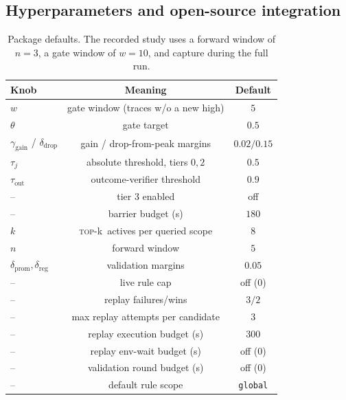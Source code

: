 \documentclass[11pt,letterpaper]{article}
\newcommand{\dpromote}{\delta_{\mathrm{prom}}}
\newcommand{\dregress}{\delta_{\mathrm{reg}}}
\newcommand{\topk}{\textsc{top-}k}
\newcommand{\gwin}{w}
\newcommand{\gtarget}{\theta}
\newcommand{\ggain}{\gamma_{\mathrm{gain}}}
\newcommand{\gdrop}{\delta_{\mathrm{drop}}}
\begin{document}
\subsection{Hyperparameters and open-source integration}
\label{sec:hyper}

\begin{table}[t]
\centering\small
\caption{Package defaults. The recorded study uses a forward window of $n=3$, a gate window of
$\gwin=10$, and capture during the full run.}
\label{tab:hyper}
\begin{tabular}{@{}lcc@{}}
\toprule
Knob & Meaning & Default \\
\midrule
$\gwin$ & gate window (traces w/o a new high) & $5$ \\
$\gtarget$ & gate target & $0.5$ \\
$\ggain$ / $\gdrop$ & gain / drop-from-peak margins & $0.02/0.15$ \\
$\tau_j$ & absolute threshold, tiers $0,2$ & $0.5$ \\
$\tau_{\mathrm{out}}$ & outcome-verifier threshold & $0.9$ \\
-- & tier 3 enabled & off \\
-- & barrier budget (s) & $180$ \\
$k$ & \topk\ actives per queried scope & $8$ \\
$n$ & forward window & $5$ \\
$\dpromote,\dregress$ & validation margins & $0.05$ \\
-- & live rule cap & off ($0$) \\
-- & replay failures/wins & $3/2$ \\
-- & max replay attempts per candidate & $3$ \\
-- & replay execution budget (s) & $300$ \\
-- & replay env-wait budget (s) & off ($0$) \\
-- & validation round budget (s) & off ($0$) \\
-- & default rule scope & \texttt{global} \\
\bottomrule
\end{tabular}
\end{table}
\end{document}
